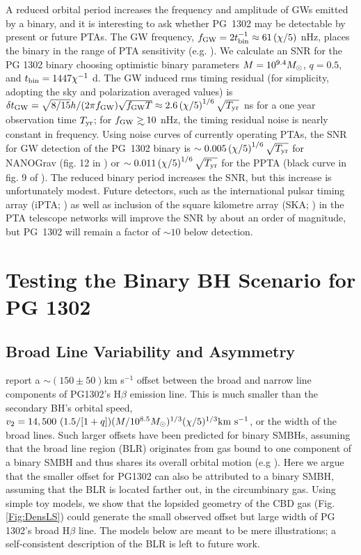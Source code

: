 A reduced orbital period increases the frequency and amplitude of
GWs emitted by a binary, and it is interesting
to ask whether PG~1302 may be detectable by present or future PTAs. The GW frequency, $f_{\rm{GW}}  = 2 t^{-1}_{\rm{bin}}
\approx 61 \left( \chi/5 \right)$ nHz, places the binary in the range
of PTA sensitivity (e.g. \citealt{iPTA}). We calculate an SNR for the PG 1302 binary
choosing optimistic binary parameters $M=10^{9.4} {M_{\odot}}$, $q=0.5$, and
$t_{\rm{bin}} = 1447\chi^{-1}$ d. 
The GW induced rms timing residual (for simplicity, adopting the sky and
polarization averaged values) is 
$\delta t_{\rm{GW}}  = \sqrt{8/15} h/(2 \pi f_{\rm{GW}} ) \sqrt{f_{\rm{GW}}  T} \approx 2.6 \left( \chi/5 \right)^{1/6} \sqrt{T_{\rm yr}}$ ns 
for a one year observation time $T_{\rm yr}$; for
$f_{\rm{GW}} \gsim10$ nHz, the timing residual noise is nearly constant in
frequency. Using noise curves of currently operating PTAs, the SNR for
GW detection of the PG~1302 binary is $\sim 0.005 \left(\chi / 5
\right)^{1/6}  \sqrt{T_{\rm yr}}$ for NANOGrav (fig. 12 in \citealt{NANOGrav2014:SC}) or
$\sim 0.011 \left( \chi / 5 \right)^{1/6}  \sqrt{T_{\rm yr}}$ for the PPTA (black curve in
fig. 9 of \citealt{PPTA:2014:SC}). The reduced binary period increases
the SNR, but this increase is unfortunately modest. Future detectors,
such as the international pulsar timing array (iPTA;
\citealt{IPTA:2013:OP}) as well as inclusion of the square kilometre
array (SKA; \citealt{SKA:2009:OP}) in the PTA telescope networks will
improve the SNR by about an order of magnitude, but PG~1302 will
remain a factor of $\sim10$ below detection.




\section{Testing the Binary BH Scenario for PG 1302}
\label{S:Predictions}
\subsection{Broad Line Variability and Asymmetry}
\label{SS:BLs}



\cite{Jackson:1992:PGHbeta} report 
a $\sim (150\pm 50)$km s$^{-1}$ offset between the broad and narrow
line components of PG1302's H$\beta$ emission line. This is much
smaller than the secondary BH's orbital
speed,\\ $v_2=14,500~(1.5/[1+q])(M/10^{8.5}M_\odot)^{1/3}(\chi/5)^{1/3}{\rm
  km~s^{-1}}$, or the width of the broad lines. Such larger offsets
have been predicted for binary SMBHs, assuming that the broad line
region (BLR) originates from gas bound to one component of a binary
SMBH and thus shares its overall orbital motion (e.g
\citealt{Tsalmantza:2011}).  Here we argue that the smaller offset for
PG1302 can also be attributed to a binary SMBH, assuming that the BLR
is located farther out, in the circumbinary gas.  Using simple toy
models, we show that the lopsided geometry of the CBD gas
(Fig. \ref{Fig:DensLS}) could generate the small observed offset but
large width of PG 1302's broad H$\beta$ line.  The models below are
meant to be mere illustrations; a self-consistent description of the
BLR is left to future work.

